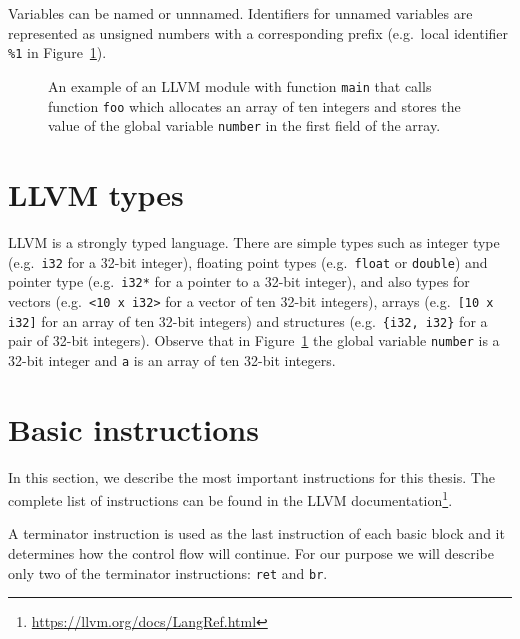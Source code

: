 Variables can be named or unnnamed. Identifiers for unnamed variables are
represented as unsigned numbers with a corresponding prefix (e.g.~local
identifier \texttt{\%1} in Figure~\ref{fig:llvm_example}).

\begin{figure}[t]
 
 \caption{An example of an LLVM module with function \texttt{main} that calls
 function \texttt{foo} which allocates an array of ten integers and stores the
 value of the global variable \texttt{number} in the first field of the array.}
 \label{fig:llvm_example}
\end{figure}

\section{LLVM types}

LLVM is a strongly typed language. There are simple types such as integer type
(e.g.~\texttt{i32} for a 32-bit integer), floating point types
(e.g.~\texttt{float} or \texttt{double}) and pointer type (e.g.~\texttt{i32*}
for a pointer to a 32-bit integer), and also types for vectors
(e.g.~\texttt{<10 x i32>} for a vector of ten 32-bit integers), arrays
(e.g.~\texttt{[10 x i32]} for an array of ten 32-bit integers) and
structures (e.g.~\texttt{\{i32, i32\}} for a pair of 32-bit integers).
Observe that in Figure~\ref{fig:llvm_example} the global variable
\texttt{number} is a 32-bit integer and \texttt{a} is an array of ten
32-bit integers.

\section{Basic instructions}

In this section, we describe the most important instructions for this thesis. The
complete list of instructions can be found in the LLVM
documentation\footnote{\url{https://llvm.org/docs/LangRef.html}}.

A terminator instruction is used as the last instruction of each basic block
and it determines how the control flow will continue. For our purpose we will
describe only two of the terminator instructions: \texttt{ret} and \texttt{br}.

